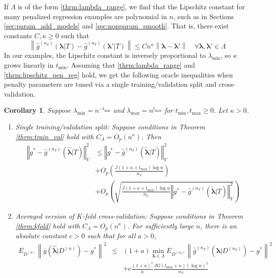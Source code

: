 \documentclass[12pt]{article}
\newtheorem{corollary}{Corollary}
\begin{document}
If $\Lambda$ is of the form \eqref{thrm:lambda_range}, we find that the Lipschitz constant for many penalized regression examples are polynomial in $n$, such as in Sections \ref{sec:param_add_models} and \ref{sec:nonparam_smooth}. That is, there exist constants $C, \kappa \ge 0$ such that
\begin{equation}
\label{thrm:lipschitz_pen_reg}
\left \| \hat{g}^{(n_T)}(\boldsymbol{\lambda}|T) - \hat{g}^{(n_T)}(\boldsymbol{\lambda}'|T) \right \| \le C n^\kappa \left \| \boldsymbol{\lambda} - \boldsymbol{\lambda}' \right \| \quad \forall \boldsymbol{\lambda}, \boldsymbol{\lambda}' \in \Lambda
\end{equation}
In our examples, the Lipschitz constant is inversely proportional to $\lambda_{\min}$, so $\kappa$ grows linearly in $t_{\min}$. Assuming that \eqref{thrm:lambda_range} and \eqref{thrm:lipschitz_pen_reg} hold, we get the following oracle inequalities when penalty parameters are tuned via a single training/validation split and cross-validation. 
\begin{corollary}
	\label{corr:penalized_reg}
	Suppose $\lambda_{\min} = n^{-t_{\min}}$ and $\lambda_{\max} = n^{t_{\max}}$ for $t_{\min}, t_{\max} \ge 0$. Let $\kappa  > 0$.
	
	\begin{enumerate}
		\item Single training/validation split: Suppose conditions in Theorem \ref{thrm:train_val} hold with $C_\Lambda = O_p (n^\kappa)$. Then
		\begin{align*}
		\left\Vert g^* - \hat{g}^{(n_T)}( \hat{\boldsymbol{\lambda}} | T) \right\Vert _{V}^2
		&\le \left\Vert g^* - \hat{g}^{(n_T)}( \tilde{\boldsymbol{\lambda}} | T) \right \Vert^2_{V}\\
		& + O_p \left(\frac{J (1 + \kappa + t_{\max})\log n}{n_{V}} \right) 
		\\
		& + O_p \left(
		\sqrt{
			\frac{J (1 + \kappa + t_{\max})\log n}{n_{V}}
			\left\Vert g^* - \hat{g}^{(n_T)}( \tilde{\boldsymbol{\lambda}}| T) \right \Vert^2_{V}
		}
		\right )
		\end{align*}
		
		\item Averaged version of $K$-fold cross-validation: Suppose conditions in Theorem \ref{thrm:kfold}  hold with $C_\Lambda = O_p(n^\kappa)$. For sufficiently large $n$, there is an absolute constant $c > 0$ such that for all $a > 0$,
		\begin{eqnarray*}
			E_{D^{(n)}} \left \| \bar{g} ( \hat{\boldsymbol \lambda} | {D^{(n)}} ) - g^* \right \|^2 &\le&
			(1+a) \min_{\boldsymbol{\lambda} \in \Lambda}  E_{D^{(n_T)}} \left \| \hat{g}^{(n_T)}(\boldsymbol \lambda | D^{(n_T)}) - g^* \right \|^2 \\
			&& + c \frac{(1+a)^2}{a} 
			\frac{JG (t_{\max} + \kappa) (\log n)^2 }{n_V} 
		\end{eqnarray*}
	\end{enumerate}
\end{corollary}
\end{document}
